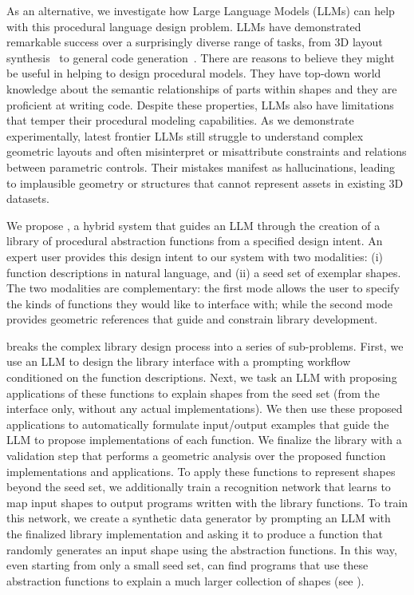 As an alternative, we investigate how Large Language Models (LLMs) can help with this procedural language design problem.
LLMs have demonstrated remarkable success over a surprisingly diverse range of tasks, from 3D layout synthesis~\cite{hu2024scenecraft} to general code generation~\cite{jiang2024survey}.
There are reasons to believe they might be useful in helping to design procedural models. 
They have top-down world knowledge about the semantic relationships of parts within shapes and they are proficient at writing code.
Despite these properties, LLMs also have limitations that temper their procedural modeling capabilities.
As we demonstrate experimentally, latest frontier LLMs still struggle to understand complex geometric layouts and often misinterpret or misattribute constraints and relations between parametric controls.
Their mistakes manifest as hallucinations, leading to implausible geometry or structures that cannot represent assets in existing 3D datasets.

We propose \methodname, a hybrid system that guides an LLM through the creation of a library of procedural abstraction functions from a specified design intent.
An expert user provides this design intent to our system with two modalities: (i) function descriptions in natural language, and (ii) a seed set of exemplar shapes.
The two modalities are complementary: the first mode allows the user to specify the kinds of functions they would like to interface with; while the second mode provides geometric references that guide and constrain library development.

\methodname breaks the complex library design process into a series of sub-problems.
First, we use an LLM to design the library interface with a prompting workflow conditioned on the function descriptions.
Next, we task an LLM with proposing applications of these functions to explain shapes from the seed set (from the interface only, without any actual implementations).
We then use these proposed applications to automatically formulate input/output examples that guide the LLM to propose implementations of each function.
We finalize the library with a validation step that performs a geometric analysis over the proposed function implementations and applications.
To apply these functions to represent shapes beyond the seed set, we additionally train a recognition network that learns to map input shapes to output programs written with the library functions.
To train this network, we create a synthetic data generator by prompting an LLM with the finalized library implementation and asking it to produce a function that randomly generates an input shape using the abstraction functions.
In this way, even starting from only a small seed set, \methodname can find programs that use these abstraction functions to explain a much larger collection of shapes (see ). 



